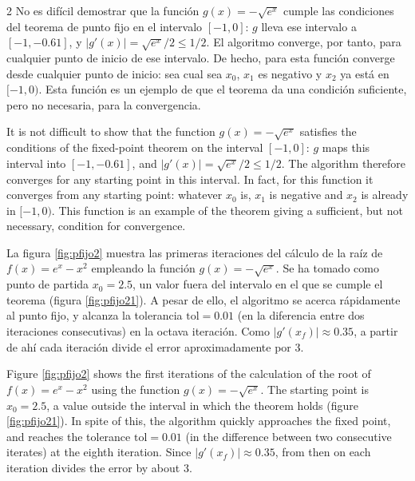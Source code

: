 \begin{paracol}{2}
No es difícil demostrar que la función $g(x)=-\sqrt{e^x}$ cumple las condiciones del teorema de punto fijo en el intervalo $[-1, 0]$: $g$ lleva ese intervalo a $[-1,-0.61]$, y $\vert g'(x)\vert=\sqrt{e^x}/2\leq 1/2$. El algoritmo converge, por tanto, para cualquier punto de inicio de ese intervalo. De hecho, para esta función converge desde cualquier punto de inicio: sea cual sea $x_0$, $x_1$ es negativo y $x_2$ ya está en $[-1,0)$. Esta función es un ejemplo de que el teorema da una condición suficiente, pero no necesaria, para la convergencia.

\switchcolumn

It is not difficult to show that the function $g(x)=-\sqrt{e^x}$ satisfies the conditions of the fixed-point theorem on the interval $[-1, 0]$: $g$ maps this interval into $[-1,-0.61]$, and $\vert g'(x)\vert=\sqrt{e^x}/2\leq 1/2$. The algorithm therefore converges for any starting point in this interval. In fact, for this function it converges from any starting point: whatever $x_0$ is, $x_1$ is negative and $x_2$ is already in $[-1,0)$. This function is an example of the theorem giving a sufficient, but not necessary, condition for convergence.

\switchcolumn

La figura \ref{fig:pfijo2} muestra las primeras iteraciones del cálculo de la raíz de $f(x)=e^x-x^2$ empleando la función $g(x)=-\sqrt{e^x}$. Se ha tomado como punto de partida $x_0=2.5$, un valor fuera del intervalo en el que se cumple el teorema (figura \ref{fig:pfijo21}). A pesar de ello, el algoritmo se acerca rápidamente al punto fijo, y alcanza la tolerancia $\text{tol}=0.01$ (en la diferencia entre dos iteraciones consecutivas) en la octava iteración. Como $\vert g'(x_f)\vert\approx0.35$, a partir de ahí cada iteración divide el error aproximadamente por 3.

\switchcolumn

Figure \ref{fig:pfijo2} shows the first iterations of the calculation of the root of $f(x)=e^x-x^2$ using the function $g(x)=-\sqrt{e^x}$. The starting point is $x_0=2.5$, a value outside the interval in which the theorem holds (figure \ref{fig:pfijo21}). In spite of this, the algorithm quickly approaches the fixed point, and reaches the tolerance $\text{tol}=0.01$ (in the difference between two consecutive iterates) at the eighth iteration. Since $\vert g'(x_f)\vert\approx0.35$, from then on each iteration divides the error by about 3.

\end{paracol}


